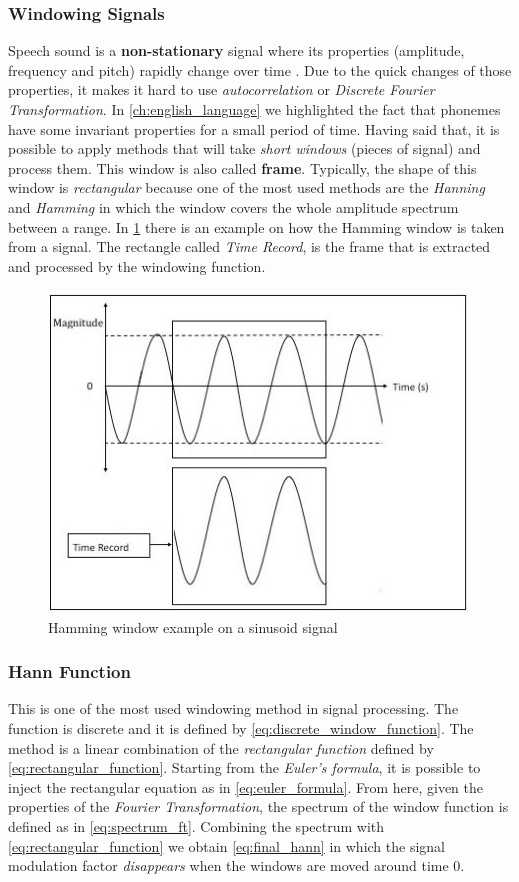 \subsubsection{Windowing Signals}
\label{ssubs:windowing_signals}
Speech sound is a \textbf{non-stationary} signal where its properties (amplitude, frequency and pitch) rapidly change over time \cite{windowing_fi}. Due to the quick changes of those properties, it makes it hard to use \textit{autocorrelation} or \textit{Discrete Fourier Transformation}. In \ref{ch:english_language} we highlighted the fact that phonemes have some invariant properties for a small period of time. Having said that, it is possible to apply methods that will take \textit{short windows} (pieces of signal) and process them. This window is also called \textbf{frame}. Typically, the shape of this window is \textit{rectangular} because one of the most used methods are the \textit{Hanning} and \textit{Hamming} in which the window covers the whole amplitude spectrum between a range. In \ref{fig:windowing_ex} there is an example on how the Hamming window is taken from a signal. The rectangle called \textit{Time Record}, is the frame that is extracted and processed by the windowing function.

\begin{figure}[!ht]
	\centering
	\includegraphics[scale=0.5]{Figures/windowing.png}
	\caption{Hamming window example on a sinusoid signal}
	\label{fig:windowing_ex}
\end{figure}


\subsubsection{Hann Function}
\label{ssubs:hann_function}
This is one of the most used windowing method in signal processing. The function is discrete and it is defined by \ref{eq:discrete_window_function}. The method is a linear combination of the \textit{rectangular function} defined by \ref{eq:rectangular_function}. Starting from the \textit{Euler's formula}, it is possible to inject the rectangular equation as in \ref{eq:euler_formula}. From here, given the properties of the \textit{Fourier Transformation}, the spectrum of the window function is defined as in \ref{eq:spectrum_ft}. Combining the spectrum with \ref{eq:rectangular_function} we obtain \ref{eq:final_hann} in which the signal modulation factor \textit{disappears} when the windows are moved around time $0$.

